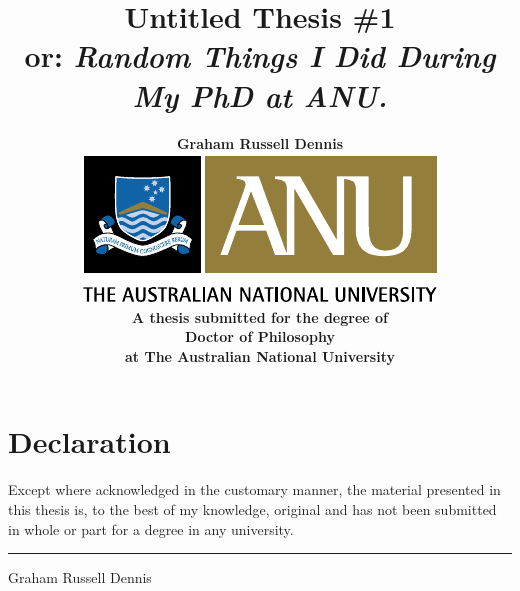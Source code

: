 \documentclass[twoside,onecolumn,11pt,a4paper,final]{book}
\begin{document}

\begin{titlepage}
\title{\textbf{Untitled Thesis \#1}\\[2cm]
        or: \emph{Random Things I Did During My PhD at ANU.}}
 \author{\textbf{Graham Russell Dennis}\\[6cm]
 \includegraphics{ANU_PMS}\\[2cm]
  \textbf{A thesis submitted for the degree of}\\
  \textbf{Doctor of Philosophy} \\
  \textbf{at The Australian National University}\\[1cm]}
\maketitle
 \end{titlepage}
 
 \sloppy
 
\chapter*{Declaration}


Except where acknowledged in the customary manner, the material 
presented in this thesis is, to the best of my knowledge, original and 
has not been submitted in whole or part for a degree in any 
university.

\vspace{20mm}  %

\hspace{80mm}\rule{40mm}{.15mm}\par   %
\hspace{80mm} Graham Russell Dennis\par
\end{document}
